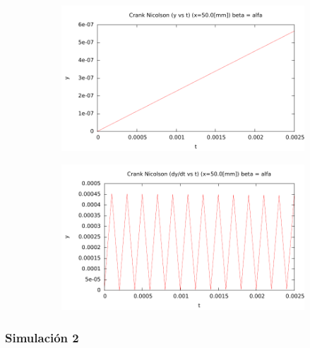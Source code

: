 \begin{center}
\begin{figure} [H]
	\begin{subfigure}[b]{0.3\textwidth}
		\includegraphics{./parte3/graficos/grafico_cn_S1_y_b2.pdf}
		\caption{} 
		\label{fig:cnS1b2_y}
	\end{subfigure}
	
	\begin{subfigure}[b]{0.3\textwidth}
		\includegraphics{./parte3/graficos/grafico_cn_S1_dy_b2.pdf}
		\caption{} 
		\label{fig:cnS1b2_dy}
	\end{subfigure}
\caption{} \label{cn_S1_b2}
\end{figure}
\end{center}


\subsubsection{Simulación 2}

